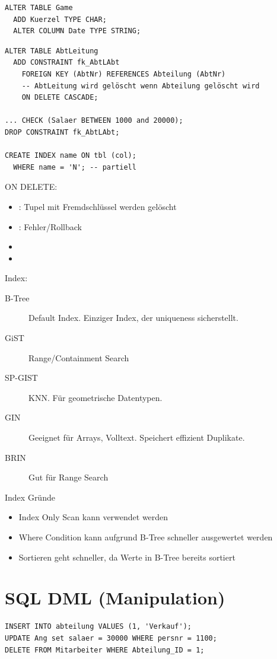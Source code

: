 \begin{multicols*}{3}
\begin{verbatim}
ALTER TABLE Game
  ADD Kuerzel TYPE CHAR;
  ALTER COLUMN Date TYPE STRING;
\end{verbatim}

\begin{verbatim}
ALTER TABLE AbtLeitung
  ADD CONSTRAINT fk_AbtLAbt
    FOREIGN KEY (AbtNr) REFERENCES Abteilung (AbtNr)
    -- AbtLeitung wird gelöscht wenn Abteilung gelöscht wird
    ON DELETE CASCADE;

... CHECK (Salaer BETWEEN 1000 and 20000);
DROP CONSTRAINT fk_AbtLAbt;

CREATE INDEX name ON tbl (col);
  WHERE name = 'N'; -- partiell

\end{verbatim}
\vspace{-7pt}
ON DELETE:
\begin{itemize}
  \item {}: Tupel mit Fremdschlüssel werden gelöscht
  \item {}: Fehler/Rollback
  \item {}
  \item {}
\end{itemize}

\vspace{3pt}
Index:
\begin{description}
    \item[B-Tree] Default Index. Einziger Index, der uniqueness sicherstellt.
    \item[GiST] Range/Containment Search
    \item[SP-GIST] KNN. Für geometrische Datentypen.
    \item[GIN] Geeignet für Arrays, Volltext. Speichert effizient Duplikate.
    \item[BRIN] Gut für Range Search
\end{description}

Index Gründe
\begin{itemize}
    \item Index Only Scan kann verwendet werden
    \item Where Condition kann aufgrund B-Tree schneller ausgewertet werden
    \item Sortieren geht schneller, da Werte in B-Tree bereits sortiert
\end{itemize}


\section{SQL DML (Manipulation)}
\begin{verbatim}
INSERT INTO abteilung VALUES (1, 'Verkauf');
UPDATE Ang set salaer = 30000 WHERE persnr = 1100;
DELETE FROM Mitarbeiter WHERE Abteilung_ID = 1;
\end{verbatim}


\end{multicols*}
